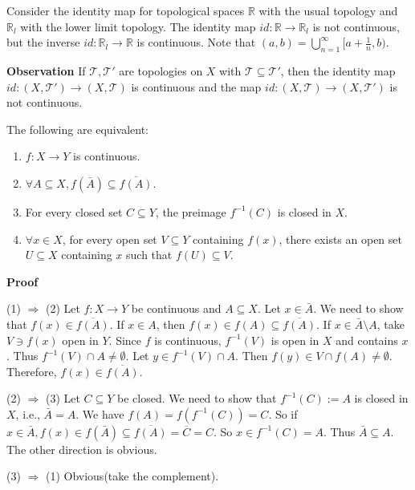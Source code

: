 \documentclass[main.tex]{subfiles}
\begin{document}
\begin{example}
    Consider the identity map for topological spaces $\mathbb{R}$ with the usual topology and $\mathbb{R}_l$ with the lower limit topology. The identity map $id: \mathbb{R} \to \mathbb{R}_l$ is not continuous, but the inverse $id: \mathbb{R}_l \to \mathbb{R}$ is continuous. Note that $(a, b) = \bigcup_{n=1}^{\infty} [a + \frac{1}{n}, b)$. 
\end{example}

\par \noindent \textbf{Observation} If $\mathcal{T}, \mathcal{T'}$ are topologies on $X$ with $\mathcal{T} \subseteq \mathcal{T'}$, then the identity map $id: (X, \mathcal{T'}) \to (X, \mathcal{T})$ is continuous and the map $id: (X, \mathcal{T}) \to (X, \mathcal{T'})$ is not continuous. 

\begin{theorem}
    The following are equivalent: 
    \begin{enumerate}
        \item $f: X \to Y$ is continuous.
        \item $\forall A \subseteq X, f(\bar{A}) \subseteq \overline{f(A)}$.
        \item For every closed set $C \subseteq Y$, the preimage $f^{-1}(C)$ is closed in $X$. 
        \item $\forall x\in X$, for every open set $V \subseteq Y$ containing $f(x)$, there exists an open set $U \subseteq X$ containing $x$ such that $f(U) \subseteq V$.
    \end{enumerate}
\end{theorem}

\par \noindent \textbf{Proof} 
\par (1) $\Rightarrow$ (2) Let $f: X \to Y$ be continuous and $A \subseteq X$. Let $x\in \bar{A}$. We need to show that $f(x) \in \overline{f(A)}$. If $x\in A$, then $f(x) \in f(A) \subseteq \overline{f(A)}$. If $x \in \bar{A} \setminus A$, take $V \ni f(x)$ open in $Y$. Since $f$ is continuous, $f^{-1}(V)$ is open in $X$ and contains $x$. Thus $f^{-1}(V) \cap A \neq \emptyset$. Let $y \in f^{-1}(V) \cap A$. Then $f(y) \in V \cap f(A) \neq \emptyset$. Therefore, $f(x) \in \overline{f(A)}$. 
\par (2) $\Rightarrow$ (3) Let $C \subseteq Y$ be closed. We need to show that $f^{-1}(C):= A$ is closed in $X$, i.e., $\bar{A} = A$. We have $f(A) = f(f^{-1}(C)) = C$. So if $x\in \bar{A}, f(x)\in f(\bar{A}) \subseteq \overline{f(A)} = \overline{C} = C$. So $x\in f^{-1}(C) = A$. Thus $\bar{A} \subseteq A$. The other direction is obvious. 
\par (3) $\Rightarrow$ (1) Obvious(take the complement).
\end{document}
